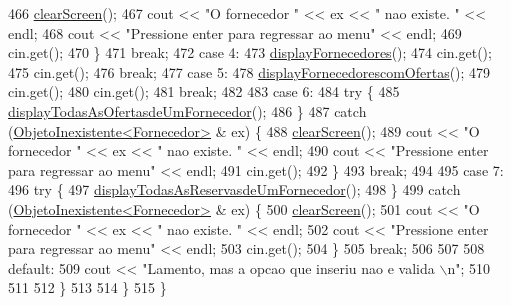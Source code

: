 \begin{DoxyCode}
466             \hyperlink{menu_8h_aceb70c1ed7e11f0863a868704f02214b}{clearScreen}();
467             cout << \textcolor{stringliteral}{"O fornecedor "} << ex << \textcolor{stringliteral}{" nao existe. "} << endl;
468             cout << \textcolor{stringliteral}{"Pressione enter para regressar ao menu"} << endl;
469             cin.get();
470         \}
471         \textcolor{keywordflow}{break};
472     \textcolor{keywordflow}{case} 4:
473         \hyperlink{classEmpresa_a55c3756c01b45b41ad03f4e4f3e4dcac}{displayFornecedores}();
474         cin.get();
475         cin.get();
476         \textcolor{keywordflow}{break};
477     \textcolor{keywordflow}{case} 5:
478         \hyperlink{classEmpresa_aa47e9a64800a41180b7f374b73a1f32b}{displayFornecedorescomOfertas}();
479         cin.get();
480         cin.get();
481         \textcolor{keywordflow}{break};
482 
483     \textcolor{keywordflow}{case} 6:
484         \textcolor{keywordflow}{try} \{
485             \hyperlink{classEmpresa_a73543b5ca1d9dd8e99e75d9167839471}{displayTodasAsOfertasdeUmFornecedor}();
486         \}
487         \textcolor{keywordflow}{catch} (\hyperlink{classObjetoInexistente}{ObjetoInexistente<Fornecedor>} & ex) \{
488             \hyperlink{menu_8h_aceb70c1ed7e11f0863a868704f02214b}{clearScreen}();
489             cout << \textcolor{stringliteral}{"O fornecedor "} << ex << \textcolor{stringliteral}{" nao existe. "} << endl;
490             cout << \textcolor{stringliteral}{"Pressione enter para regressar ao menu"} << endl;
491             cin.get();
492         \}
493         \textcolor{keywordflow}{break};
494 
495     \textcolor{keywordflow}{case} 7:
496         \textcolor{keywordflow}{try} \{
497             \hyperlink{classEmpresa_af197726a3dc20739aac877ac4c090f6e}{displayTodasAsReservasdeUmFornecedor}();
498     \}
499         \textcolor{keywordflow}{catch} (\hyperlink{classObjetoInexistente}{ObjetoInexistente<Fornecedor>} & ex) \{
500             \hyperlink{menu_8h_aceb70c1ed7e11f0863a868704f02214b}{clearScreen}();
501             cout << \textcolor{stringliteral}{"O fornecedor "} << ex << \textcolor{stringliteral}{" nao existe. "} << endl;
502             cout << \textcolor{stringliteral}{"Pressione enter para regressar ao menu"} << endl;
503             cin.get();
504         \}
505         \textcolor{keywordflow}{break};
506     
507         
508     \textcolor{keywordflow}{default}:
509         cout << \textcolor{stringliteral}{"Lamento, mas a opcao que inseriu nao e valida \(\backslash\)n"};
510 
511 
512     \}
513 
514 \}
515 \}
\end{DoxyCode}
